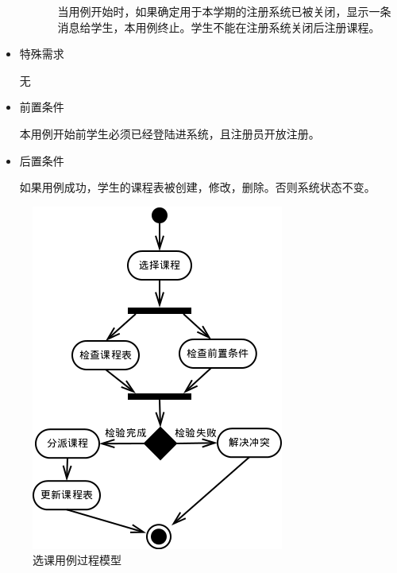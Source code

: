 \begin{itemize}
\begin{enumerate}
\begin{enumerate}[{2}.1]
      \CJKindent 当用例开始时，如果确定用于本学期的注册系统已被关闭，显示一条消息给学生，本用例终止。学生不能在注册系统关闭后注册课程。
    \end{enumerate}
  \end{enumerate}
  
  \item 特殊需求
  
  \CJKindent 无
  
  \item 前置条件
  
  \CJKindent 本用例开始前学生必须已经登陆进系统，且注册员开放注册。
  
  \item 后置条件
  
  \CJKindent 如果用例成功，学生的课程表被创建，修改，删除。否则系统状态不变。
\end{itemize}

\begin{figure}[H]
  \centering
  \includegraphics[scale=0.7]{img/jwxt_scourse.png}
  \caption{选课用例过程模型}
\end{figure}

